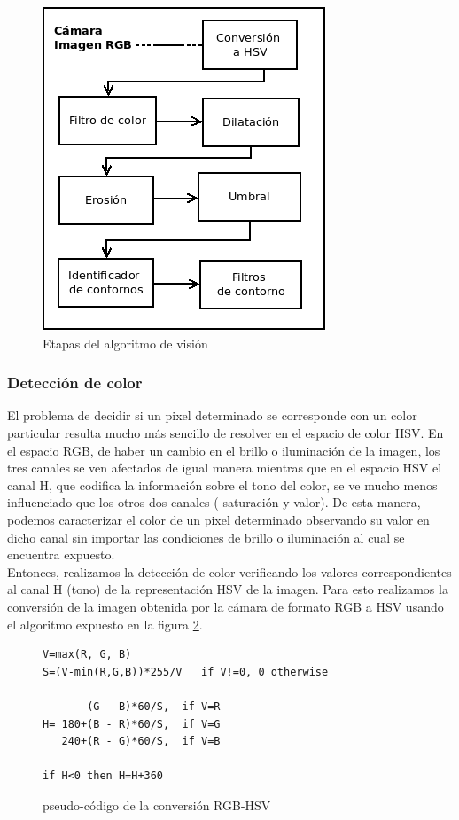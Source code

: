 \begin{figure}[tpb]
\begin{center}
  \includegraphics[scale=0.6]{figuras/vision-flow.png}
\end{center}
  \caption{Etapas del algoritmo de visión}
  \label{fig:alg_steps}
\end{figure}


\subsubsection{Detección de color}
El problema de decidir si un pixel determinado se corresponde con un color particular resulta mucho más sencillo de resolver en el espacio de color HSV. En el espacio RGB, de haber un cambio en el brillo o iluminación de la imagen, los tres canales se ven afectados de igual manera mientras que en el espacio HSV el canal H, que codifica la información sobre el tono del color, se ve mucho menos influenciado que los otros dos canales ( saturación y valor). De esta manera, podemos caracterizar el color de un pixel determinado observando su valor en dicho canal sin importar las condiciones de brillo o iluminación al cual se encuentra expuesto.
\\ \indent Entonces, realizamos la detección de color verificando los valores correspondientes al canal H (tono) de la representación HSV de la imagen. Para esto realizamos la conversión de la imagen obtenida por la cámara  de formato RGB a HSV usando el algoritmo expuesto en la figura \ref{code:hsv}.
\begin{figure}[tpb]
\begin{verbatim}
V=max(R, G, B)
S=(V-min(R,G,B))*255/V   if V!=0, 0 otherwise

       (G - B)*60/S,  if V=R
H= 180+(B - R)*60/S,  if V=G
   240+(R - G)*60/S,  if V=B

if H<0 then H=H+360
\end{verbatim}
\caption{\label{code:hsv}pseudo-código de la conversión RGB-HSV}
\end{figure}

